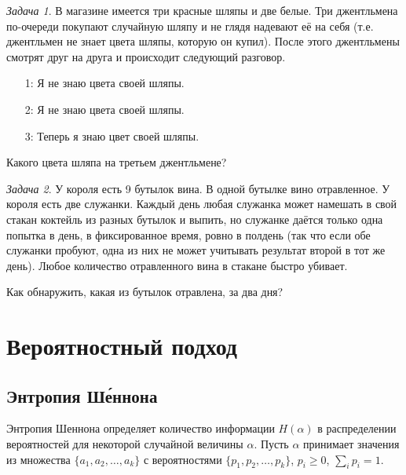 \documentclass[12pt]{article}
\newcommand{\seqn}[2]{{#1}_1,{#1}_2,\dotsc,{#1}_{#2}}
\theoremstyle{definition}
\theoremstyle{plain}
\theoremstyle{remark}
\newtheorem{problem}{Задача}[section]
\begin{document}
\begin{problem}
    В магазине имеется три красные шляпы и две белые. Три джентльмена по-очереди покупают случайную шляпу и не глядя 
    надевают её на себя (т.е. джентльмен не знает цвета шляпы, которую он купил). После этого джентльмены смотрят друг
    на друга и происходит следующий разговор.
    \begin{itemize}
        \item[1:] Я не знаю цвета своей шляпы.
        \item[2:] Я не знаю цвета своей шляпы.
        \item[3:] Теперь я знаю цвет своей шляпы.
    \end{itemize}
    Какого цвета шляпа на третьем джентльмене?
\end{problem}

\begin{problem}
    У короля есть 9 бутылок вина. В одной бутылке вино отравленное.      
    У короля есть две служанки. Каждый день любая служанка может намешать в свой стакан коктейль из разных бутылок и выпить, но служанке даётся только одна попытка в день, в фиксированное время, ровно в полдень (так что если обе служанки пробуют, одна из них не может учитывать результат второй в тот же день). Любое количество отравленного вина в стакане быстро убивает.
    
    Как обнаружить, какая из бутылок отравлена, за два дня?
\end{problem}


\section{Вероятностный подход}
\subsection{Энтропия Ш\'{е}ннона}

Энтропия Шеннона определяет количество информации \(H(\alpha)\) в распределении
вероятностей для некоторой случайной величины \(\alpha\).  Пусть \(\alpha\)
принимает значения из множества \(\{\seqn{a}{k}\}\) с вероятностями
\(\{\seqn{p}{k}\}\), \(p_i\ge 0 \), \(\sum_ip_i=1\).
\end{document}
